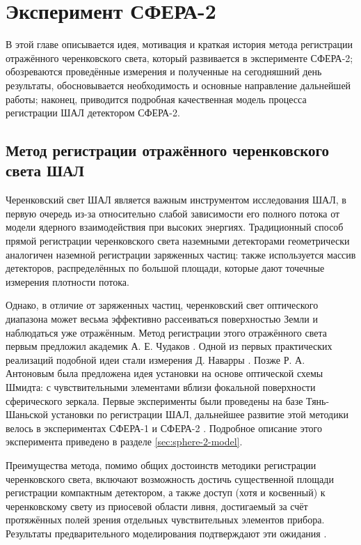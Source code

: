 \chapter{Эксперимент СФЕРА-2}

В этой главе описывается идея, мотивация и краткая история метода регистрации отражённого черенковского света, который развивается в эксперименте СФЕРА-2; обозреваются проведённые измерения и полученные на сегодняшний день результаты, обосновывается необходимость и основные направление дальнейшей работы; наконец, приводится подробная качественная модель процесса регистрации ШАЛ детектором СФЕРА-2.

\section{Метод регистрации отражённого черенковского света ШАЛ}

Черенковский свет ШАЛ является важным инструментом исследования ШАЛ, в первую очередь из-за относительно слабой зависимости его полного потока от модели ядерного взаимодействия при высоких энергиях. Традиционный способ прямой регистрации черенковского света наземными детекторами геометрически аналогичен наземной регистрации заряженных частиц: также используется массив детекторов, распределённых по большой площади, которые дают точечные измерения плотности потока.

Однако, в отличие от заряженных частиц, черенковский свет оптического диапазона может весьма эффективно рассеиваться поверхностью Земли и наблюдаться уже отражённым. Метод регистрации этого отражённого света первым предложил академик А. Е. Чудаков \cite{Чудаков1972}. Одной из первых практических реализаций подобной идеи стали измерения Д. Наварры \cite{Navarra1981}. Позже Р. А. Антоновым была предложена идея установки на основе оптической схемы Шмидта: с чувствительными элементами вблизи фокальной поверхности сферического зеркала. Первые эксперименты были проведены на базе Тянь-Шаньской установки по регистрации ШАЛ, дальнейшее развитие этой методики велось в экспериментах СФЕРА-1 и СФЕРА-2 \cite{Antonov1997, Antonov2001}. Подробное описание этого эксперимента приведено в разделе \ref{sec:sphere-2-model}.

Преимущества метода, помимо общих достоинств методики регистрации черенковского света, включают возможность достичь существенной площади регистрации компактным детектором, а также доступ (хотя и косвенный) к черенковскому свету из приосевой области ливня, достигаемый за счёт протяжённых полей зрения отдельных чувствительных элементов прибора. Результаты предварительного моделирования подтверждают эти ожидания \cite{Anokhina2007}.


